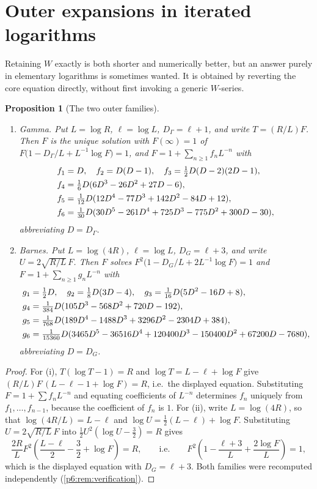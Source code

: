 \documentclass[11pt,a4paper,oneside]{book}
\theoremstyle{plain}
\newtheorem{proposition}[theorem]{Proposition}
\theoremstyle{definition}
\theoremstyle{remark}
\newcommand{\Wlam}{W}
\begin{document}
\section{Outer expansions in iterated logarithms}
\label{p6:sec:outer}

Retaining $\Wlam$ exactly is both shorter and numerically better, but an
answer purely in elementary logarithms is sometimes wanted.  It is obtained by
reverting the core equation directly, without first invoking a generic
$\Wlam$-series.

\begin{proposition}[The two outer families]\label{p6:prop:outer}
\leavevmode
\begin{enumerate}
\item \emph{Gamma.}  Put $L=\log R$, $\ell=\log L$, $D_\Gamma=\ell+1$, and
write $T=(R/L)F$.  Then $F$ is the unique solution with $F(\infty)=1$ of
$F\bigl(1-D_\Gamma/L+L^{-1}\log F\bigr)=1$, and
$F=1+\sum_{n\ge1}f_nL^{-n}$ with
\begin{align}
 f_1&=D,\quad f_2=D(D-1),\quad f_3=\tfrac12D(D-2)(2D-1),\notag\\
 f_4&=\tfrac16D(6D^{3}-26D^{2}+27D-6),\notag\\
 f_5&=\tfrac1{12}D(12D^{4}-77D^{3}+142D^{2}-84D+12),\notag\\
 f_6&=\tfrac1{30}D(30D^{5}-261D^{4}+725D^{3}-775D^{2}+300D-30),
 \label{p6:eq:outer-gamma}
\end{align}
abbreviating $D=D_\Gamma$.
\item \emph{Barnes.}  Put $L=\log(4R)$, $\ell=\log L$, $D_G=\ell+3$, and
write $U=2\sqrt{R/L}\,F$.  Then $F$ solves
$F^{2}\bigl(1-D_G/L+2L^{-1}\log F\bigr)=1$ and
$F=1+\sum_{n\ge1}g_nL^{-n}$ with
\begin{align}
 g_1&=\tfrac12D,\quad g_2=\tfrac18D(3D-4),\quad
 g_3=\tfrac1{16}D(5D^{2}-16D+8),\notag\\
 g_4&=\tfrac1{384}D(105D^{3}-568D^{2}+720D-192),\notag\\
 g_5&=\tfrac1{768}D(189D^{4}-1488D^{3}+3296D^{2}-2304D+384),\notag\\
 g_6&=\tfrac1{15360}D(3465D^{5}-36516D^{4}+120400D^{3}-150400D^{2}
 +67200D-7680),
 \label{p6:eq:outer-barnes}
\end{align}
abbreviating $D=D_G$.
\end{enumerate}
\end{proposition}

\begin{proof}
For (i), $T(\log T-1)=R$ and $\log T=L-\ell+\log F$ give
$(R/L)F\,(L-\ell-1+\log F)=R$, i.e.\ the displayed equation.  Substituting
$F=1+\sum f_nL^{-n}$ and equating coefficients of $L^{-n}$ determines $f_n$
uniquely from $f_1,\dots,f_{n-1}$, because the coefficient of $f_n$ is $1$.
For (ii), write $L=\log(4R)$, so that $\log(4R/L)=L-\ell$ and
$\log U=\tfrac12(L-\ell)+\log F$.  Substituting $U=2\sqrt{R/L}\,F$ into
$\tfrac12U^{2}(\log U-\tfrac32)=R$ gives
\[
 \frac{2R}{L}F^{2}\left(\frac{L-\ell}2-\frac32+\log F\right)=R,
 \qquad\text{i.e.}\qquad
 F^{2}\left(1-\frac{\ell+3}{L}+\frac{2\log F}{L}\right)=1 ,
\]
which is the displayed equation with $D_G=\ell+3$.  Both families were recomputed independently
(\cref{p6:rem:verification}).
\end{proof}
\end{document}
